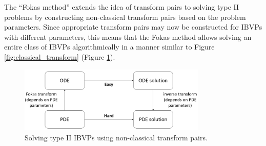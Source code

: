 \documentclass[11pt, oneside, a4paper]{article}
\begin{document}
The ``Fokas method''\cite{Fokas2008} extends the idea of transform pairs to solving type II problems by constructing non-classical transform pairs based on the problem parameters. Since appropriate transform pairs may now be constructed for IBVPs with different parameters, this means that the Fokas method allows solving an entire class of IBVPs algorithmically in a manner similar to Figure \ref{fig:classical_transform} (Figure \ref{fig:non-classical_transform}).
\begin{figure}[htpb!]
    \centering
    \includegraphics[width=0.8\textwidth]{non-classical_transform.png}
    \caption{Solving type II IBVPs using non-classical transform pairs.}
    \label{fig:non-classical_transform}
\end{figure}
\end{document}

